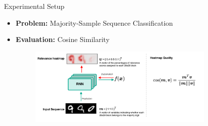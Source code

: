 \documentclass[Nike]{tuberlinbeamer}
\begin{document}
\begin{frame}{Experimental Setup}
\begin{itemize}
	\item <1-3> \textbf{Problem:} Majority-Sample Sequence Classification

	\item <3> \textbf{Evaluation:} Cosine Similarity 
 \begin{figure}[h]
	\includegraphics [width=0.85\textwidth]{figures/present_evaluation}
\end{figure}

\end{itemize}


\end{frame}
\end{document}
